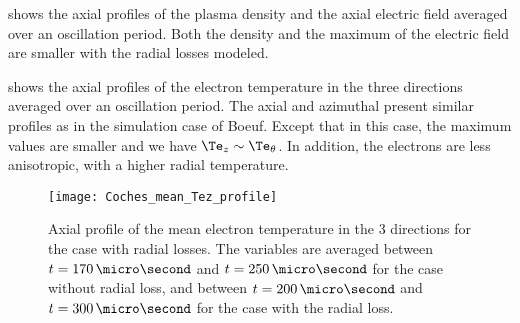    shows the axial profiles of the plasma density and the axial electric field averaged over an oscillation period.
  Both the density and the maximum of the electric field are smaller with the radial losses modeled.
  
   shows the axial profiles of the electron temperature in the three directions averaged over an oscillation period.
  The axial and azimuthal present similar profiles as in the simulation case of Boeuf.
  Except that in this case, the maximum values are smaller and we have $\Te_z \sim \Te_{\theta}$.
  In addition, the electrons are less anisotropic, with a higher radial temperature.
  
  \begin{figure}[hbt]
    \centering
    \texttt{[image: Coches\_mean\_Tez\_profile]}
    \caption{ Axial profile of the mean electron temperature in the 3 directions for the case with radial losses. The variables are averaged  between $t=170\,\micro\second$ and $t=250\,\micro\second$ for the case without radial loss, and  between $t=200\,\micro\second$ and $t=300\,\micro\second$ for the case with the radial loss.}
    \label{fig-coche-axial-Te}
  \end{figure}
  
  \FloatBarrier

  